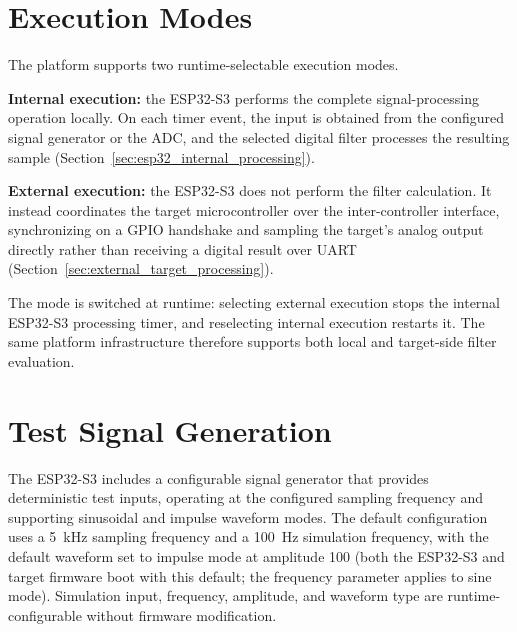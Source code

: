 
\section{Execution Modes}
\label{sec:execution_modes}

The platform supports two runtime-selectable execution modes.

\textbf{Internal execution:} the ESP32-S3 performs the complete
signal-processing operation locally. On each timer event, the input is
obtained from the configured signal generator or the ADC, and the
selected digital filter processes the resulting sample
(Section~\ref{sec:esp32_internal_processing}).

\textbf{External execution:} the ESP32-S3 does not perform the filter
calculation. It instead coordinates the target microcontroller over
the inter-controller interface, synchronizing on a GPIO handshake and
sampling the target's analog output directly rather than receiving a
digital result over UART (Section~\ref{sec:external_target_processing}).

The mode is switched at runtime: selecting external execution stops the
internal ESP32-S3 processing timer, and reselecting internal execution restarts
it. The same platform infrastructure therefore supports both local and
target-side filter evaluation.


\section{Test Signal Generation}
\label{sec:test_signal_generation}

The ESP32-S3 includes a configurable signal generator that provides
deterministic test inputs, operating at the configured sampling frequency and
supporting sinusoidal and impulse waveform modes. The default configuration
uses a 5~kHz sampling frequency and a 100~Hz simulation frequency, with the
default waveform set to impulse mode at amplitude 100 (both the ESP32-S3 and
target firmware boot with this default; the frequency parameter applies to sine
mode). Simulation input, frequency, amplitude, and waveform type are
runtime-configurable without firmware modification.

